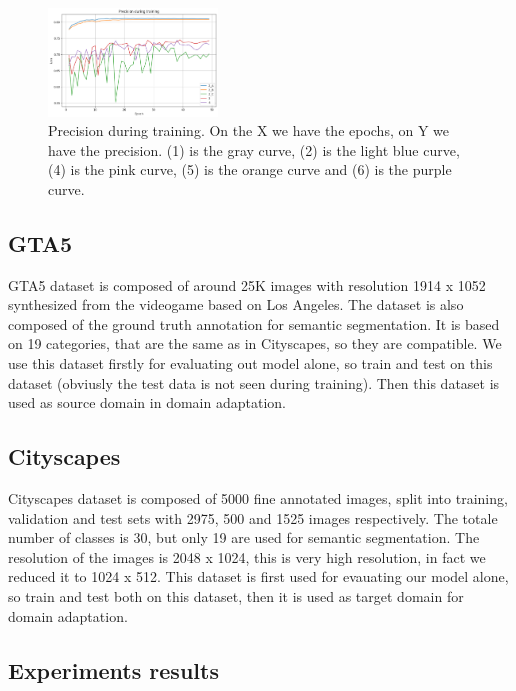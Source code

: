 \documentclass[conference]{IEEEtran}
\begin{document}
\begin{figure}[tp]
\centerline{\includegraphics[width=0.4\textwidth]{figures/precision}}
\caption{Precision during training. On the X we have the epochs, on Y we have the precision. (1) is the gray curve, (2) is the light blue
curve, (4) is the pink curve, (5) is the orange curve and (6) is the purple curve.}
\label{precision}
\end{figure}

\subsection{GTA5}
GTA5 dataset \cite{b4} is composed of around 25K images with resolution 1914 x 1052 synthesized from the videogame based on Los Angeles.
The dataset is also composed of the ground truth annotation for semantic segmentation. It is based on 19 categories, that are the same
as in Cityscapes, so they are compatible. We use this dataset firstly for evaluating out model alone, so train and test on this dataset
(obviusly the test data is not seen during training). Then this dataset is used as source domain in domain adaptation.
\subsection{Cityscapes}
Cityscapes dataset \cite{b5} is composed of 5000 fine annotated images, split into training, validation and test sets with 2975, 500
and 1525 images respectively. The totale number of classes is 30, but only 19 are used for semantic segmentation. The resolution of the
images is 2048 x 1024, this is very high resolution, in fact we reduced it to 1024 x 512. This dataset is first used for evauating our
model alone, so train and test both on this dataset, then it is used as target domain for domain adaptation. 
\subsection{Experiments results}
\end{document}
